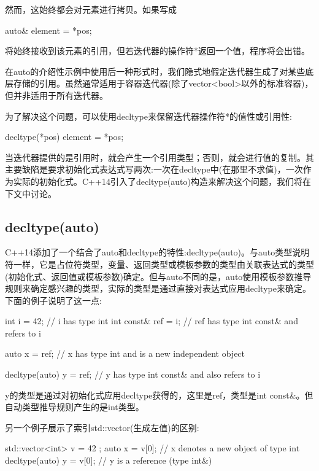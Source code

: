 然而，这始终都会对元素进行拷贝。如果写成

\begin{cpp}
auto& element = *pos;
\end{cpp}

将始终接收到该元素的引用，但若迭代器的操作符*返回一个值，程序将会出错。

\begin{notice}在auto的介绍性示例中使用后一种形式时，我们隐式地假定迭代器生成了对某些底层存储的引用。虽然通常适用于容器迭代器(除了vector<bool>以外的标准容器)，但并非适用于所有迭代器。
\end{notice}

为了解决这个问题，可以使用decltype来保留迭代器操作符*的值性或引用性:

\begin{cpp}
decltype(*pos) element = *pos;
\end{cpp}

当迭代器提供的是引用时，就会产生一个引用类型；否则，就会进行值的复制。其主要缺陷是要求初始化式表达式写两次:一次在decltype中(在那里不求值)，一次作为实际的初始化式。C++14引入了decltype(auto)构造来解决这个问题，我们将在下文中讨论。

\subsection{decltype(auto)}

C++14添加了一个结合了auto和decltype的特性:decltype(auto)。与auto类型说明符一样，它是占位符类型，变量、返回类型或模板参数的类型由关联表达式的类型(初始化式、返回值或模板参数)确定。但与auto不同的是，auto使用模板参数推导规则来确定感兴趣的类型，实际的类型是通过直接对表达式应用decltype来确定。下面的例子说明了这一点:

\begin{cpp}
int i = 42; // i has type int
int const& ref = i; // ref has type int const& and refers to i

auto x = ref; // x has type int and is a new independent object

decltype(auto) y = ref; // y has type int const& and also refers to i
\end{cpp}

y的类型是通过对初始化式应用decltype获得的，这里是ref，类型是int const\&。但自动类型推导规则产生的是int类型。

另一个例子展示了索引std::vector(生成左值)的区别:

\begin{cpp}
std::vector<int> v = { 42 };
auto x = v[0]; // x denotes a new object of type int
decltype(auto) y = v[0]; // y is a reference (type int&)
\end{cpp}

